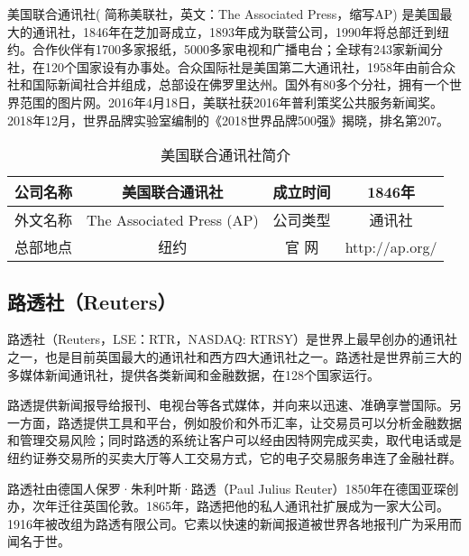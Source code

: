 \documentclass[a4paper,openany]{book}
\begin{document}
美国联合通讯社( 简称美联社，英文：The Associated Press，缩写AP) 是美国最大的通讯社，1846年在芝加哥成立，1893年成为联营公司，1990年将总部迁到纽约。合作伙伴有1700多家报纸，5000多家电视和广播电台；全球有243家新闻分社，在120个国家设有办事处。合众国际社是美国第二大通讯社，1958年由前合众社和国际新闻社合并组成，总部设在佛罗里达州。国外有80多个分社，拥有一个世界范围的图片网。2016年4月18日，美联社获2016年普利策奖公共服务新闻奖。2018年12月，世界品牌实验室编制的《2018世界品牌500强》揭晓，排名第207。

\begin{table}[ht]
\centering
\setlength{\belowcaptionskip}{5pt}
\caption{美国联合通讯社简介}
\begin{tabular}{|c|c|c|c|}
\hline
公司名称 & 美国联合通讯社                   & 成立时间   & 1846年           \\ \hline
外文名称 & The Associated Press (AP) & 公司类型   & 通讯社            \\ \hline
总部地点 & 纽约                        & 官    网 & http://ap.org/ \\ \hline
\end{tabular}
\end{table}


\subsection{路透社（Reuters）}

路透社（Reuters，LSE：RTR，NASDAQ: RTRSY）是世界上最早创办的通讯社之一，也是目前英国最大的通讯社和西方四大通讯社之一。路透社是世界前三大的多媒体新闻通讯社，提供各类新闻和金融数据，在128个国家运行。

路透提供新闻报导给报刊、电视台等各式媒体，并向来以迅速、准确享誉国际。另一方面，路透提供工具和平台，例如股价和外币汇率，让交易员可以分析金融数据和管理交易风险；同时路透的系统让客户可以经由因特网完成买卖，取代电话或是纽约证券交易所的买卖大厅等人工交易方式，它的电子交易服务串连了金融社群。

路透社由德国人保罗·朱利叶斯·路透（Paul Julius Reuter）1850年在德国亚琛创办，次年迁往英国伦敦。1865年，路透把他的私人通讯社扩展成为一家大公司。1916年被改组为路透有限公司。它素以快速的新闻报道被世界各地报刊广为采用而闻名于世。
\end{document}
